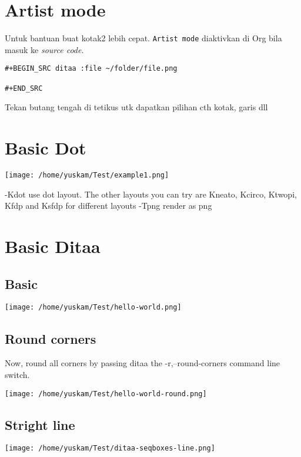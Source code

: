 \documentclass[11pt]{article}
\author{Yusman Kamaleri}
\date{\today}
\title{}
\begin{document}
\tableofcontents

\section{Artist mode}
\label{sec:org764259d}
Untuk bantuan buat kotak2 lebih cepat. \texttt{Artist mode} diaktivkan di Org bila masuk ke \emph{source code}.

\begin{verbatim}
#+BEGIN_SRC ditaa :file ~/folder/file.png

#+END_SRC
\end{verbatim}

Tekan butang tengah di tetikus utk dapatkan pilihan cth kotak, garis dll

\section{Basic Dot}
\label{sec:org678538a}
\texttt{[image: /home/yuskam/Test/example1.png]}

-Kdot use dot layout. The other layouts you can try are Kneato, Kcirco, Ktwopi, Kfdp and Ksfdp for different layouts
-Tpng render as png

\section{Basic Ditaa}
\label{sec:org212a151}

\subsection{Basic}
\label{sec:org33b067d}
\texttt{[image: /home/yuskam/Test/hello-world.png]}

\subsection{Round corners}
\label{sec:org9df906e}
Now, round all corners by passing ditaa the -r,--round-corners command line switch.

\texttt{[image: /home/yuskam/Test/hello-world-round.png]}

\subsection{Stright line}
\label{sec:org65e1f35}
\texttt{[image: /home/yuskam/Test/ditaa-seqboxes-line.png]}
\end{document}
